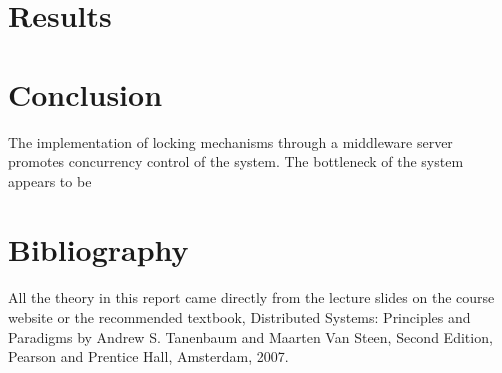 \documentclass[letterpaper,12pt]{article}
\begin{document}
\section{Results}

\section{Conclusion}

The implementation of locking mechanisms through a middleware server promotes concurrency control of the system. The bottleneck of the system appears to be 

\section{Bibliography}

All the theory in this report came directly from the lecture slides on the course website or the recommended textbook, Distributed Systems: Principles and Paradigms by Andrew S. Tanenbaum and Maarten Van Steen, Second Edition, Pearson and Prentice Hall, Amsterdam, 2007. 
\end{document}
